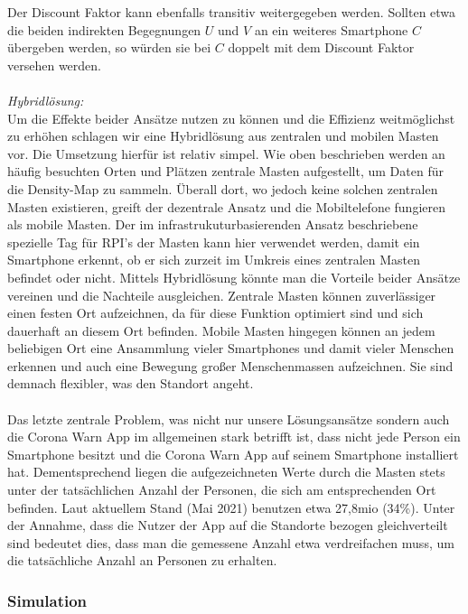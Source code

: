 \documentclass[conference]{IEEEtran}
\begin{document}
Der Discount Faktor kann ebenfalls transitiv weitergegeben werden. 
Sollten etwa die beiden indirekten Begegnungen $U$ und $V$ an ein weiteres Smartphone $C$ übergeben werden, so würden sie bei $C$ doppelt mit dem Discount Faktor versehen werden.\\
\\
\textit{Hybridlösung:}\\
Um die Effekte beider Ansätze nutzen zu können und die Effizienz weitmöglichst zu erhöhen schlagen wir eine Hybridlösung aus zentralen und mobilen Masten vor. 
Die Umsetzung hierfür ist relativ simpel. Wie oben beschrieben werden an häufig besuchten Orten und Plätzen zentrale Masten aufgestellt, um Daten für die Density-Map zu sammeln. 
Überall dort, wo jedoch keine solchen zentralen Masten existieren, greift der dezentrale Ansatz und die Mobiltelefone fungieren als mobile Masten. 
Der im infrastrukuturbasierenden Ansatz beschriebene spezielle Tag für RPI's der Masten kann hier verwendet werden, damit ein Smartphone erkennt, ob er sich zurzeit im Umkreis eines zentralen Masten befindet oder nicht. 
Mittels Hybridlösung könnte man die Vorteile beider Ansätze vereinen und die Nachteile ausgleichen. Zentrale Masten können zuverlässiger einen festen Ort aufzeichnen, da für diese Funktion optimiert sind und sich dauerhaft an diesem Ort befinden.
Mobile Masten hingegen können an jedem beliebigen Ort eine Ansammlung vieler Smartphones und damit vieler Menschen erkennen und auch eine Bewegung großer Menschenmassen aufzeichnen.
Sie sind demnach flexibler, was den Standort angeht.\\
\\
Das letzte zentrale Problem, was nicht nur unsere Lösungsansätze sondern auch die Corona Warn App im allgemeinen stark betrifft ist, dass nicht jede Person ein Smartphone besitzt und die  Corona Warn App auf seinem Smartphone installiert hat. 
Dementsprechend liegen die aufgezeichneten Werte durch die Masten stets unter der tatsächlichen Anzahl der Personen, die sich am entsprechenden Ort befinden. Laut aktuellem Stand (Mai 2021) benutzen etwa 27,8mio (34\%). 
Unter der Annahme, dass die Nutzer der App auf die Standorte bezogen gleichverteilt sind bedeutet dies, dass man die gemessene Anzahl etwa verdreifachen muss, um die tatsächliche Anzahl an Personen zu erhalten.\\

\subsubsection{Simulation}
\end{document}
